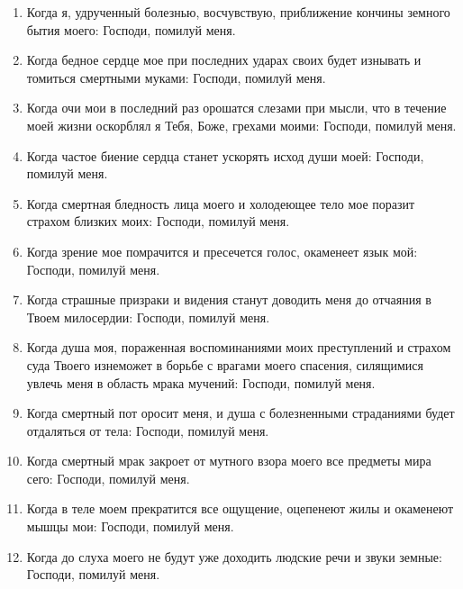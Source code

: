 \begin{mymulticols}
 
\begin{enumerate}

\item Когда я, удрученный болезнью, восчувствую, приближение кончины земного бытия моего: Господи, помилуй меня. 

\item Когда бедное сердце мое при последних ударах своих будет изнывать и томиться смертными муками: Господи, помилуй меня. 

\item Когда очи мои в последний раз орошатся слезами при мысли, что в течение моей жизни оскорблял я Тебя, Боже, грехами моими: Господи, помилуй меня. 

\item Когда частое биение сердца станет ускорять исход души моей: Господи, помилуй меня. 

\item Когда смертная бледность лица моего и холодеющее тело мое поразит страхом близких моих: Господи, помилуй меня. 

\item Когда зрение мое помрачится и пресечется голос, окаменеет язык мой: Господи, помилуй меня. 

\item Когда страшные призраки и видения станут доводить меня до отчаяния в Твоем милосердии: Господи, помилуй меня. 

\item Когда душа моя, пораженная воспоминаниями моих преступлений и страхом суда Твоего изнеможет в борьбе с врагами моего спасения, силящимися увлечь меня в область мрака мучений: Господи, помилуй меня. 

\item Когда смертный пот оросит меня, и душа с болезненными страданиями будет отдаляться от тела: Господи, помилуй меня. 

\item Когда смертный мрак закроет от мутного взора моего все предметы мира сего: Господи, помилуй меня. 

\item Когда в теле моем прекратится все ощущение, оцепенеют жилы и окаменеют мышцы мои: Господи, помилуй меня. 

\item Когда до слуха моего не будут уже доходить людские речи и звуки земные: Господи, помилуй меня. 


\end{enumerate}
\end{mymulticols}
